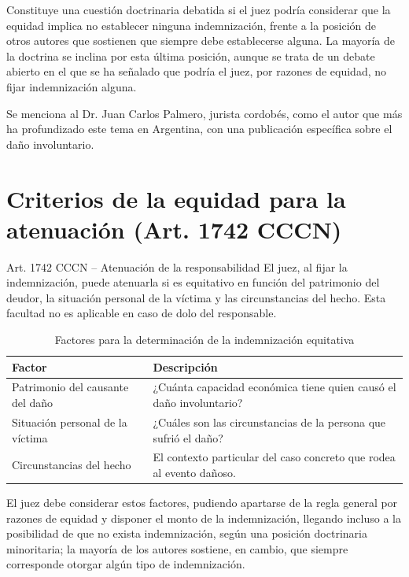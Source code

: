 \documentclass[12pt,oneside]{book}
\begin{document}
\begin{note}
Constituye una cuestión doctrinaria debatida si el juez podría considerar que la equidad implica no establecer ninguna indemnización, frente a la posición de otros autores que sostienen que siempre debe establecerse alguna. La mayoría de la doctrina se inclina por esta última posición, aunque se trata de un debate abierto en el que se ha señalado que podría el juez, por razones de equidad, no fijar indemnización alguna.

Se menciona al Dr. Juan Carlos Palmero, jurista cordobés, como el autor que más ha profundizado este tema en Argentina, con una publicación específica sobre el daño involuntario.
\end{note}

\section{Criterios de la equidad para la atenuación (Art. 1742 CCCN)}

\begin{definition}{Art. 1742 CCCN -- Atenuación de la responsabilidad}
El juez, al fijar la indemnización, puede atenuarla si es equitativo en función del patrimonio del deudor, la situación personal de la víctima y las circunstancias del hecho. Esta facultad no es aplicable en caso de dolo del responsable.
\end{definition}

\begin{table}[H]
\centering
\caption{Factores para la determinación de la indemnización equitativa}
\begin{tabularx}{\textwidth}{l X}
\toprule
\textbf{Factor} & \textbf{Descripción} \\
\midrule
Patrimonio del causante del daño & ¿Cuánta capacidad económica tiene quien causó el daño involuntario? \\
Situación personal de la víctima & ¿Cuáles son las circunstancias de la persona que sufrió el daño? \\
Circunstancias del hecho & El contexto particular del caso concreto que rodea al evento dañoso. \\
\bottomrule
\end{tabularx}
\end{table}

El juez debe considerar estos factores, pudiendo apartarse de la regla general por razones de equidad y disponer el monto de la indemnización, llegando incluso a la posibilidad de que no exista indemnización, según una posición doctrinaria minoritaria; la mayoría de los autores sostiene, en cambio, que siempre corresponde otorgar algún tipo de indemnización.
\end{document}
